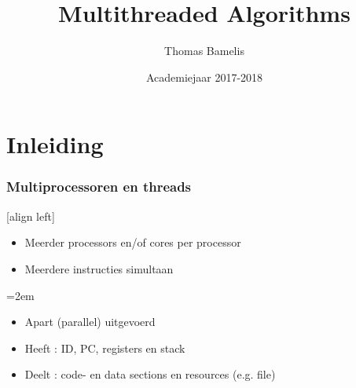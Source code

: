 \documentclass
   [kulak] %
   {kulakbeamer}
\title[Multithreaded Algorithms]{Multithreaded Algorithms}
\author[T. Bamelis]{Thomas Bamelis}
\institute[Kulak]{KU Leuven Kulak}
\date{Academiejaar 2017-2018}
\begin{document}
\begin{titleframe}
\titlepage
\end{titleframe}

\begin{outlineframe}[Overzicht]
\tableofcontents
\end{outlineframe}


\section{Inleiding}

\begin{frame}
\frametitle{Multiprocessoren en threads}

[align left]
\begin{description}
	\pause
	\item[\textbf{Multiprocessors}]
	\pause 
	\begin{itemize}
		\item  Meerder processors en/of cores per processor
		
		\item  Meerdere instructies simultaan
	\end{itemize}
	
	\itemsep=2em
	\pause
	
	\item[\textbf{Threading}] 
	
	
	\pause
	
	
	\begin{itemize}
		\item  Apart (parallel) uitgevoerd
		
		\item Heeft : ID, PC, registers en stack
		
		\item Deelt : code- en data sections en resources (e.g. file)
		
	\end{itemize}  
\end{description}

\end{frame}
\end{document}
